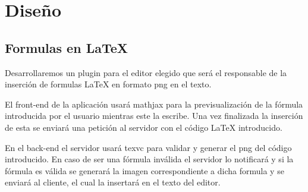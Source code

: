 \chapter{Diseño}

\section{Formulas en {\LaTeX}}

Desarrollaremos un plugin para el editor elegido que será el responsable de la inserción de formulas {\LaTeX} en formato png en el texto.

El front-end de la aplicación usará mathjax para la previsualización de la fórmula introducida por el usuario mientras este la escribe. Una vez finalizada la inserción de esta se enviará una petición al servidor con el código {\LaTeX} introducido. 

En el back-end el servidor usará texvc para validar y generar el png del código introducido. En caso de ser una fórmula inválida el servidor lo notificará y si la fórmula es válida se generará la imagen correspondiente a dicha formula y se enviará al cliente, el cual la insertará en el texto del editor.

